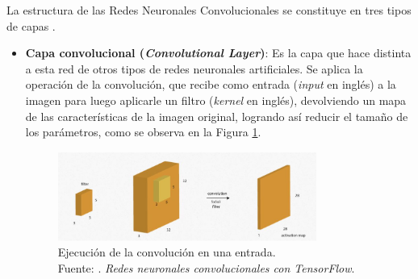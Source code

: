 \begin{itemize}
\begin{itemize}
		La estructura de las Redes Neuronales Convolucionales se constituye en tres tipos de capas \parencite{tec_lopez2016cnnTF}.
		\begin{itemize}
			\item \textbf{Capa convolucional (\textit{Convolutional Layer})}: Es la capa que hace distinta a esta red de otros tipos de redes neuronales artificiales. Se aplica la operación de la convolución, que recibe como entrada (\textit{input} en inglés) a la imagen para luego aplicarle un filtro (\textit{kernel} en inglés), devolviendo un mapa de las características de la imagen original, logrando así reducir el tamaño de los parámetros, como se observa en la Figura \ref{2:fig26}.
			\begin{figure}[h]
				\begin{center}
					\includegraphics[width=0.80\textwidth]{2/figures/convolucion.jpg}
					\caption[Ejecución de la convolución en una entrada]{Ejecución de la convolución en una entrada.\\
					Fuente: \cite{tec_lopez2016cnnTF}. \textit{Redes neuronales convolucionales con TensorFlow}.}
					\label{2:fig26}
				\end{center}
			\end{figure}
			

\end{itemize}
\end{itemize}
\end{itemize}
